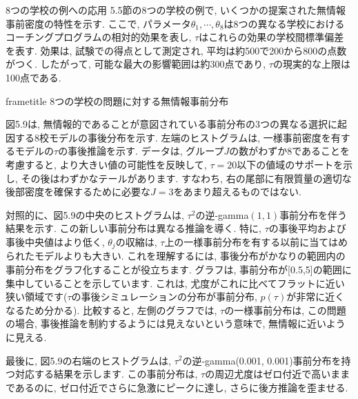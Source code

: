 \documentclass[10pt,dvipdfmx,a4]{beamer}
\newcommand{\dbox}[1]{\begin{beamercolorbox}[wd=122mm, sep=0pt, shadow=false, rounded=false]{frametitle} { #1}\end{beamercolorbox}}
\begin{document}
\begin{frame}{8つの学校の例への応用}
5.5節の8つの学校の例で, いくつかの提案された無情報事前密度の特性を示す.
ここで, パラメータ$\theta_1,\cdots, \theta_8$は8つの異なる学校におけるコーチングプログラムの相対的効果を表し, $\tau$はこれらの効果の学校間標準偏差を表す.
効果は, 試験での得点として測定され, 平均は約500で200から800の点数がつく.
したがって, 可能な最大の影響範囲は約300点であり, $\tau$の現実的な上限は100点である.

\dbox{8つの学校の問題に対する無情報事前分布}
図5.9は, 無情報的であることが意図されている事前分布の3つの異なる選択に起因する8校モデルの事後分布を示す.
左端のヒストグラムは, 一様事前密度を有するモデルの$\tau$の事後推論を示す.
データは, グループ$J$の数がわずか8であることを考慮すると, より大きい値の可能性を反映して, $\tau=20$以下の値域のサポートを示し, その後はわずかなテールがあります.
すなわち, 右の尾部に有限質量の適切な後部密度を確保するために必要な$J=3$をあまり超えるものではない.
\end{frame}


\begin{frame}
対照的に、図5.9の中央のヒストグラムは, $\tau^2$の逆-gamma$(1,1)$事前分布を伴う結果を示す.
この新しい事前分布は異なる推論を導く.
特に, $\tau$の事後平均および事後中央値はより低く, $\theta_j$の収縮は, $\tau$上の一様事前分布を有する以前に当てはめられたモデルよりも大きい.
これを理解するには, 事後分布がかなりの範囲内の事前分布をグラフ化することが役立ちます.
グラフは, 事前分布が[0.5,5]の範囲に集中していることを示しています.
これは, 尤度がこれに比べてフラットに近い狭い領域です($\tau$の事後シミュレーションの分布が事前分布, $p(\tau)$が非常に近くなるため分かる).
比較すると, 左側のグラフでは, $\tau$の一様事前分布は, この問題の場合, 事後推論を制約するようには見えないという意味で, 無情報に近いように見える.

最後に, 図5.9の右端のヒストグラムは, $\tau^2$の逆-gamma(0.001, 0.001)事前分布を持つ対応する結果を示します.
この事前分布は, $\tau$の周辺尤度はゼロ付近で高いままであるのに, ゼロ付近でさらに急激にピークに達し, さらに後方推論を歪ませる.
\end{frame}

\end{document}
